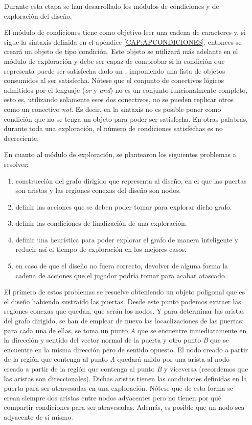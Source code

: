 Durante esta etapa se han desarrollado los módulos de condiciones y de exploración del diseño.

El módulo de condiciones tiene como objetivo leer una cadena de caracteres y, si sigue la sintaxis definida en el apéndice \ref{CAP:APCONDICIONES}, entonces se creará un objeto de tipo condición. Este objeto se utilizará más adelante en el módulo de exploración y debe ser capaz de comprobar si la condición que representa puede ser satisfecha dado un , imponiendo una lista de objetos consumidos al ser satisfecha.
Nótese que el conjunto de conectivos lógicos admitidos por el lenguaje (\textit{or} y \textit{and}) no es un conjunto funcionalmente completo, esto es, utilizando solamente esos dos conectivos, no se pueden replicar otros como un conectivo \textit{not}. Es decir, en la sintaxis no es posible poner como condición que no se tenga un objeto para poder ser satisfecha. En otras palabras, durante toda una exploración, el número de condiciones satisfechas es no decreciente.

En cuanto al módulo de exploración, se plantearon los siguientes problemas a resolver:
\begin{enumerate}
	\item construcción del grafo dirigido que representa al diseño, en el que las puertas son aristas y las regiones conexas del diseño son nodos.
	\item definir las acciones que se deben poder tomar para explorar dicho grafo.
	\item definir las condiciones de finalización de una exploración.
	\item definir una heurística para poder explorar el grafo de manera inteligente y reducir así el tiempo de exploración en los mejores casos.
	\item en caso de que el diseño no fuera correcto, devolver de alguna forma la cadena de acciones que el jugador podría tomar para acabar atascado.
\end{enumerate}

El primero de estos problemas se resuelve obteniendo un objeto poligonal que es el diseño habiendo sustraido las puertas. Desde este punto podemos extraer las regiones conexas que quedan, que serán los nodos. Y para determinar las aristas del grafo dirigido, se han de emplear de nuevo las locaclizaciones de las puertas:
para cada una de ellas, se toma un punto \textit{A} que se encuentre inmediatamente en la dirección y sentido del vector normal de la puerta y otro punto \textit{B} que se encuentre en la misma dirección pero de sentido opuesto.
El nodo creado a partir de la región que contenga al punto \textit{A} quedará unido por una arista al nodo creado a partir de la región que contenga al punto \textit{B} y viceversa (recordemos que las aristas son direccionales). Dichas aristas tienen las condiciones definidas en la puerta para ser atravesadas en una exploración. Nótese que de esta forma se crean siempre dos aristas entre nodos adyacentes pero no tienen por qué compartir condiciones para ser atravesadas. Además, es posible que un nodo sea adyacente de sí mismo.

